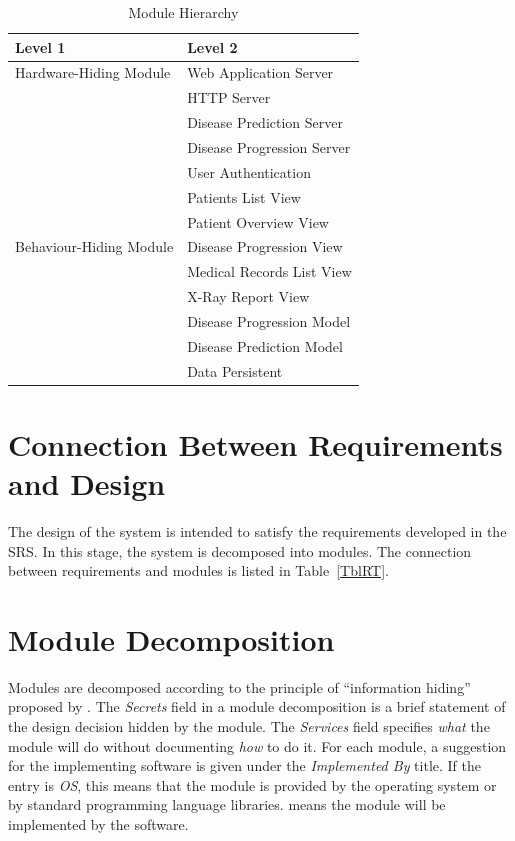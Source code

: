 \documentclass[12pt, titlepage]{article}
\begin{document}
\begin{table}[h!]
\centering
\begin{tabular}{p{} p{}}
\toprule
\textbf{Level 1} & \textbf{Level 2}\\
\midrule

{Hardware-Hiding Module} &  Web Application Server\\
& HTTP Server \\
& Disease Prediction Server\\
& Disease Progression Server\\
\midrule

\multirow{7}{0.3\textwidth}{Behaviour-Hiding Module} & User Authentication \\
& Patients List View\\
& Patient Overview View \\
& Disease Progression View \\
& Medical Records List View\\
& X-Ray Report View\\
\midrule

\multirow{3}{0.3\textwidth}{Software Decision Module} & Disease Progression Model \\
& Disease Prediction Model\\
& Data Persistent \\
\bottomrule

\end{tabular}
\caption{Module Hierarchy}
\label{TblMH}
\end{table}

\section{Connection Between Requirements and Design} \label{SecConnection}

The design of the system is intended to satisfy the requirements developed in
the SRS. In this stage, the system is decomposed into modules. The connection
between requirements and modules is listed in Table~\ref{TblRT}.


\section{Module Decomposition} \label{SecMD}

Modules are decomposed according to the principle of ``information hiding''
proposed by \citet{ParnasEtAl1984}. The \emph{Secrets} field in a module
decomposition is a brief statement of the design decision hidden by the
module. The \emph{Services} field specifies \emph{what} the module will do
without documenting \emph{how} to do it. For each module, a suggestion for the
implementing software is given under the \emph{Implemented By} title. If the
entry is \emph{OS}, this means that the module is provided by the operating
system or by standard programming language libraries.  \emph{\progname{}} means the
module will be implemented by the \progname{} software.
\end{document}
